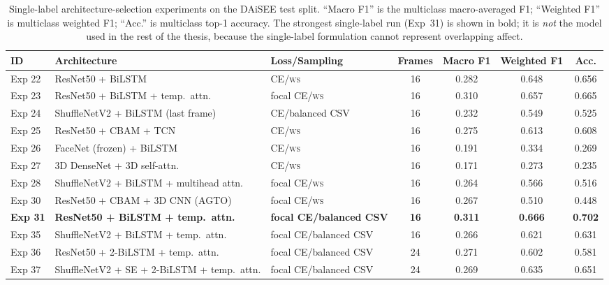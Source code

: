 \begin{table}[H]
\centering
\small
\caption{Single-label architecture-selection experiments on the DAiSEE test split. ``Macro F1'' is the multiclass macro-averaged F1; ``Weighted F1'' is multiclass weighted F1; ``Acc.'' is multiclass top-1 accuracy. The strongest single-label run (Exp~31) is shown in bold; it is \emph{not} the model used in the rest of the thesis, because the single-label formulation cannot represent overlapping affect.}
\label{tab:fer_arch_selection_singlelabel}
\begin{tabular}{lp{4.4cm}lcccc}
\toprule
\textbf{ID} & \textbf{Architecture} & \textbf{Loss/Sampling} & \textbf{Frames} & \textbf{Macro F1} & \textbf{Weighted F1} & \textbf{Acc.} \\
\midrule
Exp 22 & ResNet50 + BiLSTM                                         & CE/\textsc{ws}            & 16 & 0.282 & 0.648 & 0.656 \\
Exp 23 & ResNet50 + BiLSTM + temp.\ attn.                          & focal CE/\textsc{ws}      & 16 & 0.310 & 0.657 & 0.665 \\
Exp 24 & ShuffleNetV2 + BiLSTM (last frame)                        & CE/balanced CSV           & 16 & 0.232 & 0.549 & 0.525 \\
Exp 25 & ResNet50 + CBAM + TCN                                     & CE/\textsc{ws}            & 16 & 0.275 & 0.613 & 0.608 \\
Exp 26 & FaceNet (frozen) + BiLSTM                                 & CE/\textsc{ws}            & 16 & 0.191 & 0.334 & 0.269 \\
Exp 27 & 3D DenseNet + 3D self-attn.                               & CE/\textsc{ws}            & 16 & 0.171 & 0.273 & 0.235 \\
Exp 28 & ShuffleNetV2 + BiLSTM + multihead attn.                   & focal CE/\textsc{ws}      & 16 & 0.264 & 0.566 & 0.516 \\
Exp 30 & ResNet50 + CBAM + 3D CNN (AGTO)                           & focal CE/\textsc{ws}      & 16 & 0.267 & 0.510 & 0.448 \\
\textbf{Exp 31} & \textbf{ResNet50 + BiLSTM + temp.\ attn.}        & \textbf{focal CE/balanced CSV} & \textbf{16} & \textbf{0.311} & \textbf{0.666} & \textbf{0.702} \\
Exp 35 & ShuffleNetV2 + BiLSTM + temp.\ attn.                      & focal CE/balanced CSV     & 16 & 0.266 & 0.621 & 0.631 \\
Exp 36 & ResNet50 + 2-BiLSTM + temp.\ attn.                        & focal CE/balanced CSV     & 24 & 0.271 & 0.602 & 0.581 \\
Exp 37 & ShuffleNetV2 + SE + 2-BiLSTM + temp.\ attn.               & focal CE/balanced CSV     & 24 & 0.269 & 0.635 & 0.651 \\
\bottomrule
\end{tabular}
\end{table}

